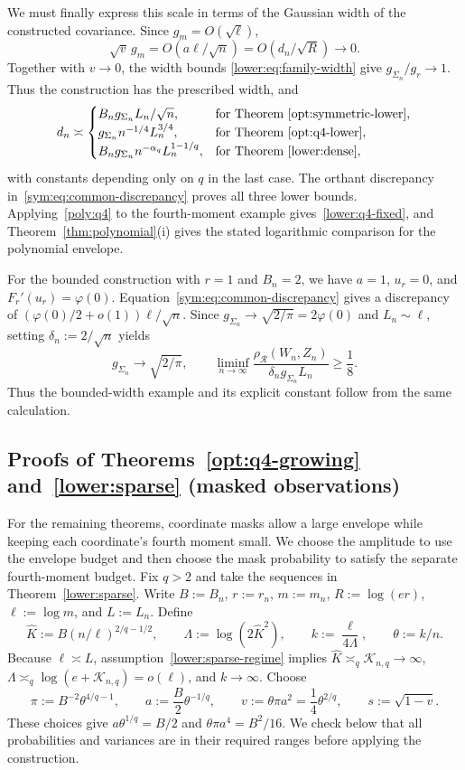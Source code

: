 \documentclass[11pt,letterpaper]{article}
\theoremstyle{remark}
\newcommand{\rh}{\rho_{\mathcal R}}
\begin{document}
We must finally express this scale in terms of the Gaussian width
of the constructed covariance. Since $g_m=O(\sqrt\ell)$,
\[
 \sqrt v\,g_m=O(a\ell/\sqrt n)=O(d_n/\sqrt R)\to0.
\]
Together with $v\to0$, the width bounds
\eqref{lower:eq:family-width} give $g_{\Sigma_n}/g_r\to1$.
Thus the construction has the prescribed width, and
\[
 d_n\asymp
 \begin{cases}
 B_n g_{\Sigma_n}L_n/\sqrt n,
   &\text{for Theorem~\ref{opt:symmetric-lower}},\\
 g_{\Sigma_n}n^{-1/4}L_n^{3/4},
   &\text{for Theorem~\ref{opt:q4-lower}},\\
 B_n g_{\Sigma_n}n^{-\alpha_q}L_n^{1-1/q},
   &\text{for Theorem~\ref{lower:dense}},
 \end{cases}
\]
with constants depending only on $q$ in the last case.
The orthant discrepancy in~\eqref{sym:eq:common-discrepancy}
proves all three lower bounds. Applying~\eqref{poly:q4} to the
fourth-moment example gives~\eqref{lower:q4-fixed}, and
Theorem~\ref{thm:polynomial}\textup{(i)} gives the stated
logarithmic comparison for the polynomial envelope.

For the bounded construction with $r=1$ and $B_n=2$, we have
$a=1$, $u_r=0$, and $F_r'(u_r)=\varphi(0)$.
Equation~\eqref{sym:eq:common-discrepancy} gives a discrepancy
of $(\varphi(0)/2+o(1))\ell/\sqrt n$. Since
$g_{\Sigma_n}\to\sqrt{2/\pi}=2\varphi(0)$ and $L_n\sim\ell$,
setting $\delta_n:=2/\sqrt n$ yields
\[
 g_{\Sigma_n}\to\sqrt{2/\pi},\qquad
 \liminf_{n\to\infty}
 \frac{\rh(W_n,Z_n)}{\delta_n g_{\Sigma_n}L_n}\ge\frac18.
\]
Thus the bounded-width example and its explicit constant follow
from the same calculation.

\subsection{Proofs of Theorems~\ref*{opt:q4-growing} and~\ref*{lower:sparse} (masked observations)}
\label{app:q4-growing}

For the remaining theorems, coordinate masks allow a large envelope
while keeping each coordinate's fourth moment small. We choose the
amplitude to use the envelope budget and then choose the mask
probability to satisfy the separate fourth-moment budget.
Fix $q>2$ and take the sequences in Theorem~\ref{lower:sparse}.
Write $B:=B_n$, $r:=r_n$, $m:=m_n$, $R:=\log(er)$,
$\ell:=\log m$, and $L:=L_n$. Define
\[
 \widehat K:=B(n/\ell)^{2/q-1/2},\qquad
 \Lambda:=\log(2\widehat K^2),\qquad
 k:=\frac{\ell}{4\Lambda},\qquad \theta:=k/n.
\]
Because $\ell\asymp L$, assumption~\eqref{lower:sparse-regime}
implies $\widehat K\asymp_q\mathcal K_{n,q}\to\infty$,
$\Lambda\asymp_q\log(e+\mathcal K_{n,q})=o(\ell)$,
and $k\to\infty$. Choose
\begin{equation}
 \pi:=B^{-2}\theta^{4/q-1},\qquad
 a:=\frac B2\theta^{-1/q},\qquad
 v:=\theta\pi a^2=\frac14\theta^{2/q},\qquad s:=\sqrt{1-v}.
 \label{q4:eq:sparse-parameters}
\end{equation}
These choices give $a\theta^{1/q}=B/2$ and
$\theta\pi a^4=B^2/16$. We check below that all probabilities
and variances are in their required ranges before applying the
construction.
\end{document}
